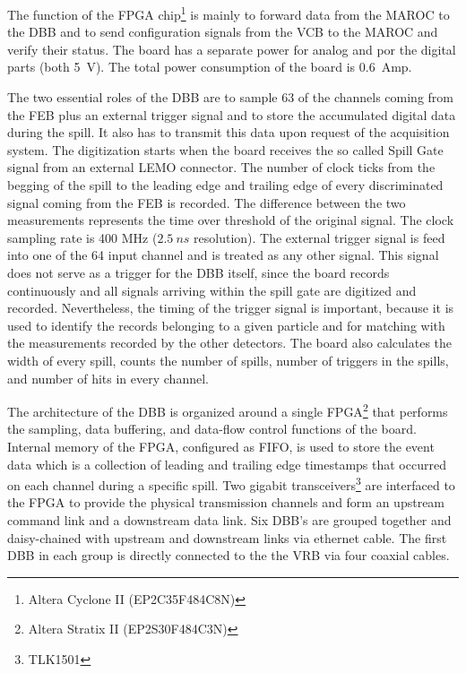 \documentclass[a4paper,11pt]{article}
\begin{document}
The function of the FPGA chip\footnote{Altera Cyclone II (EP2C35F484C8N)} is mainly to forward data from the MAROC to the DBB and to send configuration
signals from the VCB to the MAROC and verify their status. The board has a separate power for analog and por the digital parts (both 5~V). The total
power consumption of the board is 0.6~Amp.

The two essential roles of the DBB are to sample 63 of the channels coming from the FEB plus an external trigger signal and to store the accumulated
digital data during the spill. It also has to transmit this data upon request of the acquisition system. The digitization starts when the board
receives the so called Spill Gate signal from an external LEMO connector. The number of clock ticks from the begging of the spill to the leading edge
and trailing edge of every discriminated signal coming from the FEB is recorded. The difference between the two measurements represents the time over
threshold of the original signal. The clock sampling rate is 400 MHz ($2.5 \ ns$ resolution). The external trigger signal is feed into one of the
64 input channel and is treated as any other signal. This signal does not serve as a trigger for the DBB itself, since the board records continuously
and all signals arriving within the spill gate are digitized and recorded. Nevertheless, the timing of the trigger signal is important, because it is
used to identify the records belonging to a given particle and for matching with the measurements recorded by the other detectors. The board also
calculates the width of every spill, counts the number of spills, number of triggers in the spills, and number of hits in every channel.

The architecture of the DBB is organized around a single FPGA\footnote{Altera Stratix II (EP2S30F484C3N)} that performs the sampling, data
buffering, and data-flow control functions of the board. Internal memory of the FPGA, configured as FIFO, is used to store the event data which is
a collection of leading and trailing edge timestamps that occurred on each channel during a specific spill. Two gigabit transceivers\footnote{TLK1501}
are interfaced to the FPGA to provide the physical transmission channels and form an upstream command link and a downstream data link. Six DBB's are
grouped together and daisy-chained with upstream and downstream links via ethernet cable. The first DBB in each group is directly connected to the
the VRB via four coaxial cables.
\end{document}
